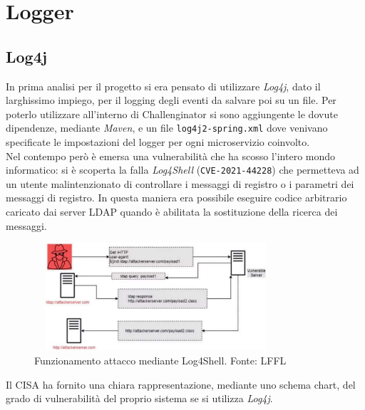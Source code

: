 \chapter{Logger}\label{logger}

\section{Log4j}

In prima analisi per il progetto si era pensato di utilizzare \textit{Log4j}, dato il larghissimo impiego, per il logging degli eventi da salvare poi su un file. Per poterlo utilizzare all'interno di Challenginator si sono aggiungente le dovute dipendenze, mediante \textit{Maven}, e un file \texttt{log4j2-spring.xml} dove venivano specificate le impostazioni del logger per ogni microservizio coinvolto.\\
Nel contempo però è emersa una vulnerabilità che ha scosso l'intero mondo informatico: si è scoperta la falla \textit{Log4Shell} (\texttt{CVE-2021-44228}) che permetteva ad un utente malintenzionato di controllare i messaggi di registro o i parametri dei messaggi di registro. In questa maniera era possibile eseguire codice arbitrario caricato dai server LDAP quando è abilitata la sostituzione della ricerca dei messaggi.
\begin{figure}[H]
    \centering
    \includegraphics[width=9cm, height=4cm]{images/log4j-log4shell-bug.pdf}
    \caption{Funzionamento attacco mediante Log4Shell. Fonte: LFFL}
\end{figure}

Il CISA ha fornito una chiara rappresentazione, mediante uno schema chart, del grado di vulnerabilità del proprio sistema se si utilizza \textit{Log4j}. \cite{log4j}

